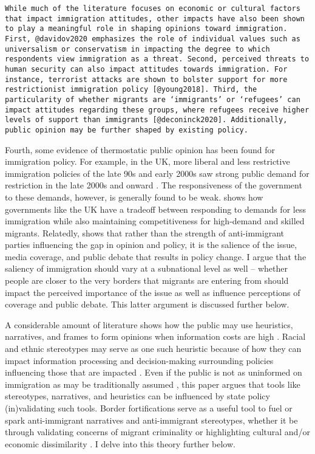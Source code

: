 \documentclass[12pt,]{article}
\begin{document}
\begin{verbatim}
While much of the literature focuses on economic or cultural factors that impact immigration attitudes, other impacts have also been shown to play a meaningful role in shaping opinions toward immigration. First, @davidov2020 emphasizes the role of individual values such as universalism or conservatism in impacting the degree to which respondents view immigration as a threat. Second, perceived threats to human security can also impact attitudes towards immigration. For instance, terrorist attacks are shown to bolster support for more restrictionist immigration policy [@young2018]. Third, the particularity of whether migrants are ‘immigrants’ or ‘refugees’ can impact attitudes regarding these groups, where refugees receive higher levels of support than immigrants [@deconinck2020]. Additionally, public opinion may be further shaped by existing policy.
\end{verbatim}

Fourth, some evidence of thermostatic public opinion has been found for
immigration policy. For example, in the UK, more liberal and less
restrictive immigration policies of the late 90s and early 2000s saw
strong public demand for restriction in the late 2000s and onward
\citep{ford2015}. The responsiveness of the government to these demands,
however, is generally found to be weak. \citet{ford2015} shows how
governments like the UK have a tradeoff between responding to demands
for less immigration while also maintaining competitiveness for
high-demand and skilled migrants. Relatedly, \citet{morales2015} shows
that rather than the strength of anti-immigrant parties influencing the
gap in opinion and policy, it is the salience of the issue, media
coverage, and public debate that results in policy change. I argue that
the saliency of immigration should vary at a subnational level as well
-- whether people are closer to the very borders that migrants are
entering from should impact the perceived importance of the issue as
well as influence perceptions of coverage and public debate. This latter
argument is discussed further below.

A considerable amount of literature shows how the public may use
heuristics, narratives, and frames to form opinions when information
costs are high
\citep{mondak1993, rugeley2012, petersen2009, aaroe2014, culpepper2024}.
Racial and ethnic stereotypes may serve as one such heuristic because of
how they can impact information processing and decision-making
surrounding policies influencing those that are impacted
\citep{burns2000}. Even if the public is not as uninformed on
immigration as may be traditionally assumed \citep{lahav2004}, this
paper argues that tools like stereotypes, narratives, and heuristics can
be influenced by state policy (in)validating such tools. Border
fortifications serve as a useful tool to fuel or spark anti-immigrant
narratives and anti-immigrant stereotypes, whether it be through
validating concerns of migrant criminality or highlighting cultural
and/or economic dissimilarity
\citep{jaramillo-dent2021, mutz2022, carter2017}. I delve into this
theory further below.
\end{document}
